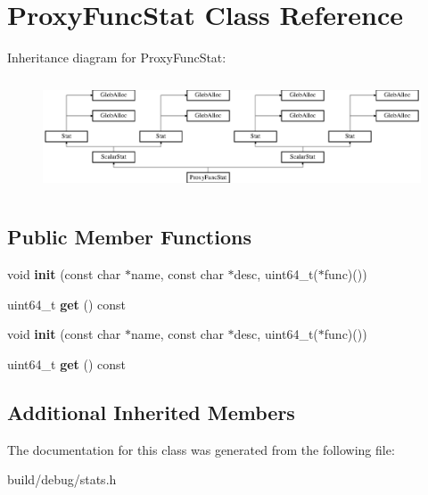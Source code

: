 \hypertarget{classProxyFuncStat}{\section{Proxy\-Func\-Stat Class Reference}
\label{classProxyFuncStat}
}
Inheritance diagram for Proxy\-Func\-Stat\-:\begin{figure}[H]
\begin{center}
\leavevmode
\includegraphics[height=3.398058cm]{classProxyFuncStat}
\end{center}
\end{figure}
\subsection*{Public Member Functions}
\begin{DoxyCompactItemize}
\item 
\hypertarget{classProxyFuncStat_ae2a77949c4e412fbecd19d96b62471a3}{void {\bfseries init} (const char $\ast$name, const char $\ast$desc, uint64\-\_\-t($\ast$func)())}\label{classProxyFuncStat_ae2a77949c4e412fbecd19d96b62471a3}

\item 
\hypertarget{classProxyFuncStat_ab5e47a48ff5b8d190f8fe87d72bb6020}{uint64\-\_\-t {\bfseries get} () const }\label{classProxyFuncStat_ab5e47a48ff5b8d190f8fe87d72bb6020}

\item 
\hypertarget{classProxyFuncStat_ae2a77949c4e412fbecd19d96b62471a3}{void {\bfseries init} (const char $\ast$name, const char $\ast$desc, uint64\-\_\-t($\ast$func)())}\label{classProxyFuncStat_ae2a77949c4e412fbecd19d96b62471a3}

\item 
\hypertarget{classProxyFuncStat_ab5e47a48ff5b8d190f8fe87d72bb6020}{uint64\-\_\-t {\bfseries get} () const }\label{classProxyFuncStat_ab5e47a48ff5b8d190f8fe87d72bb6020}

\end{DoxyCompactItemize}
\subsection*{Additional Inherited Members}


The documentation for this class was generated from the following file\-:\begin{DoxyCompactItemize}
\item 
build/debug/stats.\-h\end{DoxyCompactItemize}

